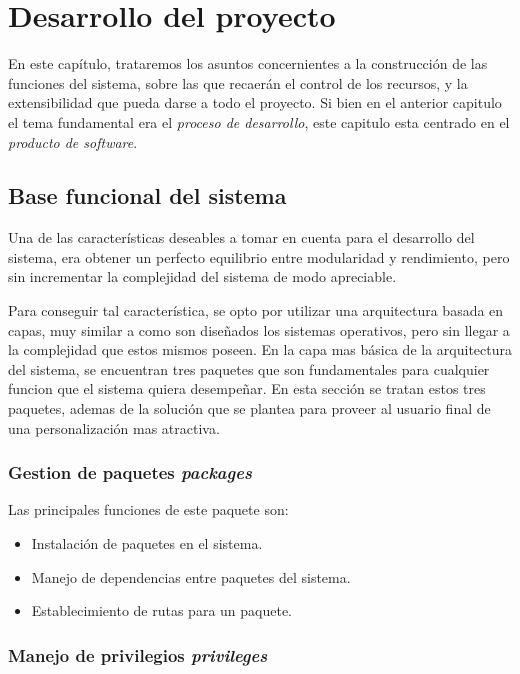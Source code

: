 \chapter{Desarrollo del proyecto}

En este capítulo, trataremos los asuntos concernientes a la construcción de las
funciones del sistema, sobre las que recaerán el control de los recursos, y la
extensibilidad que pueda darse a todo el proyecto. Si bien en el anterior
capitulo el tema fundamental era el \emph{proceso de desarrollo}, este capitulo
esta centrado en el \emph{producto de software}.

\section{Base funcional del sistema}

Una de las características deseables a tomar en cuenta para el desarrollo del
sistema, era obtener un perfecto equilibrio entre modularidad y rendimiento,
pero sin incrementar la complejidad del sistema de modo apreciable.

Para conseguir tal característica, se opto por utilizar una arquitectura basada
en capas, muy similar a como son diseñados los sistemas operativos, pero sin
llegar a la complejidad que estos mismos poseen. En la capa mas básica de la
arquitectura del sistema, se encuentran tres paquetes que son fundamentales para
cualquier funcion que el sistema quiera desempeñar. En esta sección se tratan
estos tres paquetes, ademas de la solución que se plantea para proveer al
usuario final de una personalización mas atractiva.

\subsection{Gestion de paquetes \emph{packages}}

Las principales funciones de este paquete son:
\begin{itemize}
\item Instalación de paquetes en el sistema.
\item Manejo de dependencias entre paquetes del sistema.
\item Establecimiento de rutas para un paquete.
\end{itemize}

\subsection{Manejo de privilegios \emph{privileges}}
